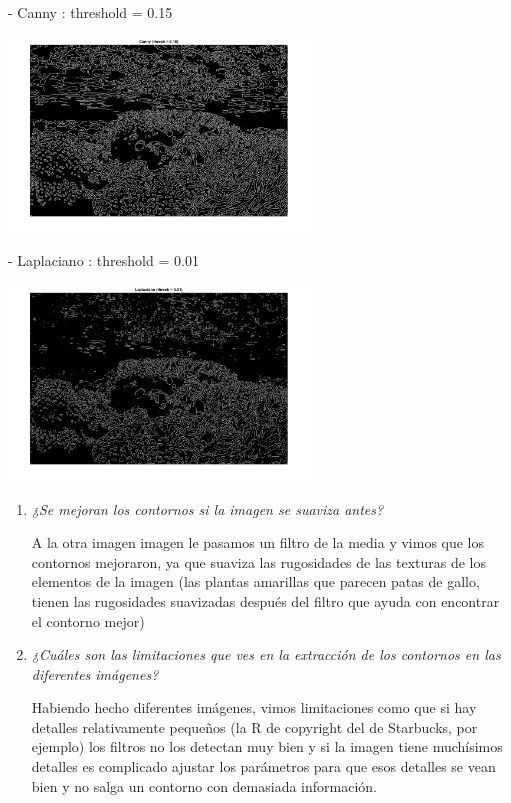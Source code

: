 \documentclass{article}
\begin{document}
\begin{enumerate}
\begin{enumerate}
 - Canny : threshold = 0.15
 
 \begin{center}
 \includegraphics[width=0.6\textwidth]{3b(canny).png}
 \end{center} 
 
 \newpage
 - Laplaciano : threshold = 0.01

 \begin{center}
 \includegraphics[width=0.6\textwidth]{3b(laplace).png}
 \end{center}
  
 \begin{enumerate} 
  \item \textit{¿Se mejoran los contornos si la imagen se suaviza antes?}
  
  A la otra imagen imagen le pasamos un filtro de la media y vimos que los contornos mejoraron, ya que suaviza las rugosidades de las texturas de los elementos de la imagen (las plantas amarillas que parecen patas de gallo, tienen las rugosidades suavizadas después del filtro que ayuda con encontrar el contorno mejor)
  
  \item \textit{¿Cuáles son las limitaciones que ves en la extracción de los contornos en las diferentes imágenes?}
  
  Habiendo hecho diferentes imágenes, vimos limitaciones como que si hay detalles relativamente pequeños (la R de copyright del de Starbucks, por ejemplo) los filtros no los detectan muy bien y si la imagen tiene muchísimos detalles es complicado ajustar los parámetros para que esos detalles se vean bien y no salga un contorno con demasiada información.
  

\end{enumerate}
\end{enumerate}
\end{enumerate}
\end{document}
